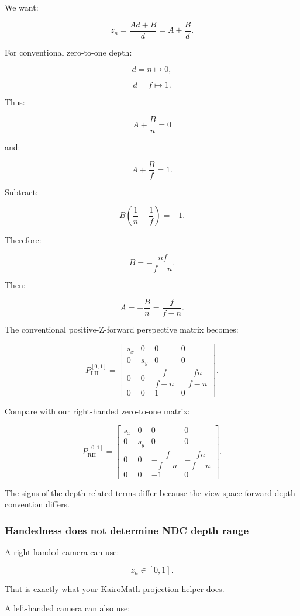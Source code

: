 We want:

\[
 z_n=\frac{Ad+B}{d} =A+\frac Bd.
\]

For conventional zero-to-one depth:

\[
 d=n\mapsto0,
\]

\[
 d=f\mapsto1.
\]

Thus:

\[
 A+\frac Bn=0
\]

and:

\[
 A+\frac Bf=1.
\]

Subtract:

\[
 B\left(\frac1n-\frac1f\right)=-1.
\]

Therefore:

\[
 \boxed{ B=-\frac{nf}{f-n} }.
\]

Then:

\[
 A=-\frac Bn=\frac f{f-n}.
\]

The conventional positive-Z-forward perspective matrix becomes:

\[
 \boxed{ P_{\mathrm{LH}}^{[0,1]}= \begin{bmatrix} s_x&0&0&0\\ 0&s_y&0&0\\ 0&0&\dfrac f{f-n}&-\dfrac{fn}{f-n}\\ 0&0&1&0 \end{bmatrix} }.
\]

Compare with our right-handed zero-to-one matrix:

\[
 P_{\mathrm{RH}}^{[0,1]}= \begin{bmatrix} s_x&0&0&0\\ 0&s_y&0&0\\ 0&0&-\dfrac f{f-n}&-\dfrac{fn}{f-n}\\ 0&0&-1&0 \end{bmatrix}.
\]

The signs of the depth-related terms differ because the view-space forward-depth convention differs.

\subsubsection{Handedness does not determine NDC depth range}\label{handedness-does-not-determine-ndc-depth-range}

A right-handed camera can use:

\[
 z_n\in[0,1].
\]

That is exactly what your KairoMath projection helper does.

A left-handed camera can also use:


